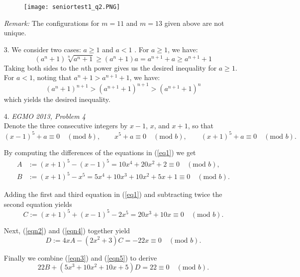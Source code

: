 \documentclass[a4paper, 12pt]{article}
\begin{document}
\begin{enumerate}
    \begin{figure}[h!]
        \centering
        \texttt{[image: seniortest1\_q2.PNG]}
    \end{figure}
    
    \textit{Remark:} The configurations for $m = 11$ and $m = 13$ given above are not unique.

    \item[3.] We consider two cases: $a \geq 1$ and $a < 1$ . For $a \geq 1$, we have:
    $$ (a^n + 1) \sqrt[n]{a^n + 1} \geq (a^n + 1) a = a^{n+1} + a \geq a^{n+1} + 1 $$
    Taking both sides to the $n$th power gives us the desired inequality for $a \geq 1$. For $a < 1$, noting that $a^n + 1 > a^{n+1} + 1$, we have:
    $$ (a^n + 1)^{n+1} > (a^{n+1} + 1)^{n+1} > (a^{n+1} + 1)^n $$
    which yields the desired inequality.
	
	\item[4.] \textit{EGMO 2013, Problem 4} \\
	Denote the three consecutive integers by $x - 1$, $x$, and $x + 1$, so that
	\begin{equation} \label{eq1}
	    (x - 1)^5 + a \equiv 0 \quad (\textrm{mod } b), \qquad x^5 + a \equiv 0 \quad (\textrm{mod } b), \qquad (x + 1)^5 + a \equiv 0 \quad (\textrm{mod } b).
	\end{equation}
	
	By computing the differences of the equations in (\ref{eq1}) we get
	\begin{align} \label{eqn2}
	    A &:= (x + 1)^5 - (x-1)^5 = 10x^4 + 20x^2 + 2 \equiv 0 \quad (\textrm{mod } b), \\ \label{eqn3}
	    B &:= (x + 1)^5 - x^5 = 5x^4 + 10x^3 + 10x^2 + 5x + 1 \equiv 0 \quad (\textrm{mod } b).
	\end{align}
	
	Adding the first and third equation in (\ref{eq1}) and subtracting twice the second equation yields
	\begin{equation} \label{eqn4}
	    C := (x + 1)^5 + (x-1)^5 - 2x^5 = 20x^3 + 10x \equiv 0 \quad (\textrm{mod } b).
	\end{equation}
	
	Next, (\ref{eqn2}) and (\ref{eqn4}) together yield
	\begin{equation} \label{eqn5}
	    D := 4xA - (2x^2 + 3)C = -22x \equiv 0 \quad (\textrm{mod } b).
	\end{equation}
	
	Finally we combine (\ref{eqn3}) and (\ref{eqn5}) to derive
	\begin{equation*}
	    22B + (5x^3 + 10x^2 + 10x + 5)D = 22 \equiv 0 \quad (\textrm{mod } b).
	\end{equation*}
	

\end{enumerate}
\end{document}

